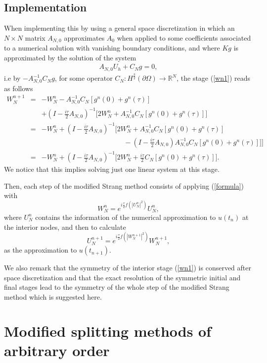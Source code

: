 \documentclass[a4paper,12pt]{article}
\begin{document}
\subsection{Implementation}
\label{implem}

When implementing this by using a general space discretization in which an $N\times N$ matrix $A_{N,0}$ approximates $A_0$ when applied to some coefficients associated to a numerical solution with vanishing boundary conditions, and where $K g$ is approximated by the solution of the system
\begin{eqnarray}
A_{N,0} U_h+ C_N g=0, \nonumber
\end{eqnarray}
i.e by $-A_{N,0}^{-1} C_N g$, for some operator $C_N: H^\frac{3}{2}(\partial \Omega) \to \mathbb{R}^N$, the stage (\ref{wn1}) reads as follows
\begin{eqnarray}
W_N^{n+1}&=&-W_N^n-A_{N,0}^{-1} C_N [g^n(0)+g^n(\tau)] \nonumber \\
&&+(I-\frac{i \tau}{2} A_{N,0})^{-1}\bigg[2 W_N^n+A_{N,0}^{-1} C_N[g^n(0)+g^n(\tau)]\bigg]
\nonumber \\
&=&-W_N^n +(I-\frac{i \tau}{2} A_{N,0})^{-1}\bigg[2 W_N^n+A_{N,0}^{-1} C_N[g^n(0)+g^n(\tau)] \nonumber \\
&& \hspace{5cm}
-(I-\frac{i \tau}{2} A_{N,0})A_{N,0}^{-1} C_N[g^n(0)+g^n(\tau)] ]\bigg] \nonumber \\
&=&-W_N^n +(I-\frac{i \tau}{2} A_{N,0})^{-1}\bigg[2 W_N^n+\frac{i \tau}{2} C_N[g^n(0)+g^n(\tau)]\bigg]. \label{formula}
\end{eqnarray}
We notice that this implies solving just one linear system at this stage.

Then, each step of the modified Strang method consists of applying (\ref{formula}) with
$$W_N^n=e^{i \frac{\tau}{2} f(|U_N^{n}|^2)} U_N^n,$$
 where $U_N^n$ contains the information of the numerical approximation to $u(t_n)$ at the interior nodes, and then to calculate
$$U_N^{n+1}=e^{i \frac{\tau}{2} f(|W_N^{n+1}|^2)}W_N^{n+1},$$
as the approximation to $u(t_{n+1})$.

We also remark that the symmetry of the interior stage (\ref{wn1}) is conserved after space discretization and that the exact resolution of the symmetric initial and final stages lead to the symmetry of the whole step of the modified Strang method which is suggested here.

\section{Modified splitting methods of arbitrary order}
\label{Ssplitanyorder}
\end{document}
